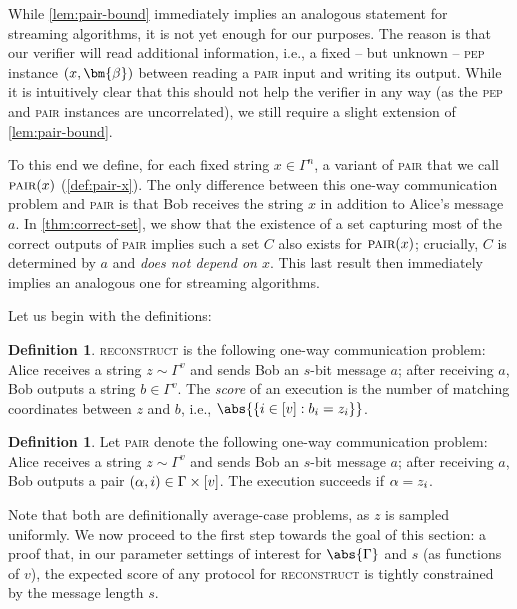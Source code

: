 \documentclass[10pt,a4paper]{article}
\theoremstyle{definition}
\newtheorem{definition}[theorem]{Definition}
\renewcommand{\set}[1]{\left\{#1\right\}}
\newcommand{\pair}{\normalfont\textsc{pair}\xspace}
\newcommand{\reconstruct}{\normalfont\textsc{reconstruct}\xspace}
\newcommand{\pep}{\normalfont\textsc{pep}\xspace}
\newcommand{\vcommitlength}{v}
\newcommand{\vcommitstring}{z}
\newcommand{\evaluationpoint}{\bm{\fe2}}
\newcommand{\alphabet}{\Gamma}
\def\fe#1{
    \ifnum#1=1
        \alpha
    \else
    \ifnum#1=2
        \beta
    \else
    \ifnum#1=3
        \gamma
    \fi\fi\fi
}
\begin{document}
While \cref{lem:pair-bound} immediately implies an analogous statement for streaming algorithms, it is not yet enough for our purposes. The reason is that our verifier will read additional information, i.e., a fixed -- but unknown -- \pep instance $(x, \evaluationpoint)$ between reading a \pair input and writing its output. While it is intuitively clear that this should not help the verifier in any way (as the \pep and \pair instances are uncorrelated), we still require a slight extension of \cref{lem:pair-bound}.

To this end we define, for each fixed string $x \in \alphabet^n$, a variant of \pair that we call $\pair(x)$ (\cref{def:pair-x}). The only difference between this one-way communication problem and \pair is that Bob receives the string $x$ in addition to Alice's message $a$. In \cref{thm:correct-set}, we show that the existence of a set capturing most of the correct outputs of \pair implies such a set $C$ also exists for $\pair(x)$; crucially, $C$ is determined by $a$ and \emph{does not depend on $x$}. This last result then immediately implies an analogous one for streaming algorithms.

Let us begin with the definitions:

\begin{definition}
    \label{def:reconstruct}
    \reconstruct is the following one-way communication problem: Alice receives a string $\vcommitstring \sim \alphabet^\vcommitlength$ and sends Bob an $s$-bit message $a$; after receiving $a$, Bob outputs a string $b \in \alphabet^\vcommitlength$. The \emph{score} of an execution is the number of matching coordinates between $\vcommitstring$ and $b$, i.e., $\abs{\set{i \in [\vcommitlength] : b_i = \vcommitstring_i}}$.
\end{definition}

\begin{definition}
    \label{def:pair}
    Let \pair denote the following one-way communication problem: Alice receives a string $\vcommitstring \sim \alphabet^\vcommitlength$ and sends Bob an $s$-bit message $a$; after receiving $a$, Bob outputs a pair $(\fe1, i) \in \alphabet \times [\vcommitlength]$. The execution succeeds if $\fe1 = \vcommitstring_i$.
\end{definition}

Note that both are definitionally average-case problems, as $\vcommitstring$ is sampled uniformly. We now proceed to the first step towards the goal of this section: a proof that, in our parameter settings of interest for $\abs{\alphabet}$ and $s$ (as functions of $\vcommitlength$), the expected score of any protocol for \reconstruct is tightly constrained by the message length $s$.
\end{document}

